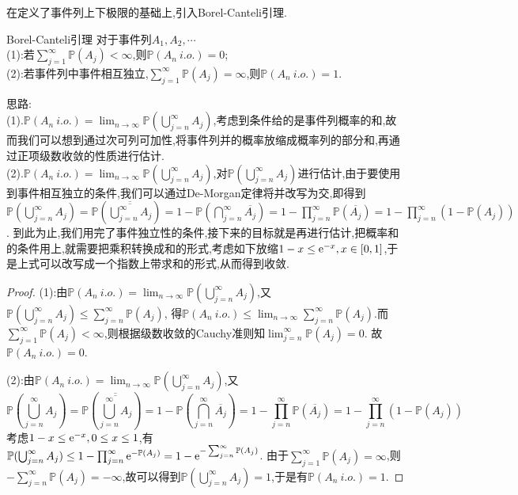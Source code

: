 \documentclass[lang=cn,10pt]{elegantbook}
\begin{document}
在定义了事件列上下极限的基础上,引入Borel-Canteli引理.
\begin{theorem}{Borel-Canteli引理}
    对于事件列$A_1,A_2,\cdots$\\
    (1):若$\sum_{j=1}^{\infty}\mathbb{P}(A_j)<\infty$,则$\mathbb{P}(A_n \ i.o.)=0$;\\
    (2):若事件列中事件相互独立,$\sum_{j=1}^{\infty}\mathbb{P}(A_j)=\infty$,则$\mathbb{P}(A_n \ i.o.)=1$.
\end{theorem}
{\kaishu
\noindent 思路:\\
(1).$\mathbb{P}(A_n\ i.o.)=\lim_{n\to\infty}\mathbb{P}(\bigcup_{j=n}^{\infty}A_j)$,考虑到条件给的是事件列概率的和,故而我们可以想到通过次可列可加性,将事件列并的概率放缩成概率列的部分和,再通过正项级数收敛的性质进行估计.\\
(2).$\mathbb{P}(A_n\ i.o.)=\lim_{n\to\infty}\mathbb{P}(\bigcup_{j=n}^{\infty}A_j)$,对$\mathbb{P}(\bigcup_{j=n}^{\infty}A_j)$进行估计,由于要使用到事件相互独立的条件,我们可以通过De-Morgan定律将并改写为交,即得到
$\mathbb{P}(\bigcup_{j=n}^{\infty}A_j)=\mathbb{P}(\overline{\overline{\bigcup_{j=n}^{\infty}A_j}})=1-\mathbb{P}(\bigcap_{j=n}^{\infty}\overline{A_j})=1-\prod_{j=n}^{\infty}\mathbb{P}(\overline{A_j})=1-\prod_{j=n}^{\infty}(1-\mathbb{P}(A_j))$.
到此为止,我们用完了事件独立性的条件,接下来的目标就是再进行估计,把概率和的条件用上,就需要把乘积转换成和的形式,考虑如下放缩$1-x\leq {\rm e}^{-x},x\in[0,1]$,于是上式可以改写成一个指数上带求和的形式,从而得到收敛.
}
\begin{proof}
    (1):由$\mathbb{P}(A_n\ i.o.)=\lim_{n\to\infty}\mathbb{P}(\bigcup_{j=n}^{\infty}A_j)$,又$\mathbb{P}(\bigcup_{j=n}^{\infty}A_j)\leq \sum_{j=n}^{\infty}\mathbb{P}(A_j)$,
    得$\mathbb{P}(A_n\ i.o.)\leq \lim_{n\to\infty}\sum_{j=n}^{\infty}\mathbb{P}(A_j)$.而$\sum_{j=1}^{\infty}\mathbb{P}(A_j)<\infty$,则根据级数收敛的Cauchy准则知$\lim_{j=n}^{\infty}\mathbb{P}(A_j)=0$.
    故$\mathbb{P}(A_n\ i.o.)=0$.

    (2):由$\mathbb{P}(A_n\ i.o.)=\lim_{n\to\infty}\mathbb{P}(\bigcup_{j=n}^{\infty}A_j)$,又$$\mathbb{P}(\bigcup_{j=n}^{\infty}A_j)=\mathbb{P}(\overline{\overline{\bigcup_{j=n}^{\infty}A_j}})=1-\mathbb{P}(\bigcap_{j=n}^{\infty}\overline{A_j})=1-\prod_{j=n}^{\infty}\mathbb{P}(\overline{A_j})=1-\prod_{j=n}^{\infty}(1-\mathbb{P}(A_j))$$
    考虑$1-x\leq{\rm e}^{-x},0\leq x\leq 1$,有$\mathbb{P}(\bigcup_{j=n}^{\infty}A_j)\leq 1-\prod_{j=n}^{\infty}{\rm e}^{-\mathbb{P}(A_j)}=1-{\rm e}^{-\sum_{j=n}^{\infty}\mathbb{P}(A_j)}$.
    由于$\sum_{j=1}^{\infty}\mathbb{P}(A_j)=\infty$,则$-\sum_{j=n}^{\infty}\mathbb{P}(A_j)=-\infty$,故可以得到$\mathbb{P}(\bigcup_{j=n}^{\infty}A_j)=1$,于是有$\mathbb{P}(A_n\ i.o.)=1$.
\end{proof}
\end{document}

